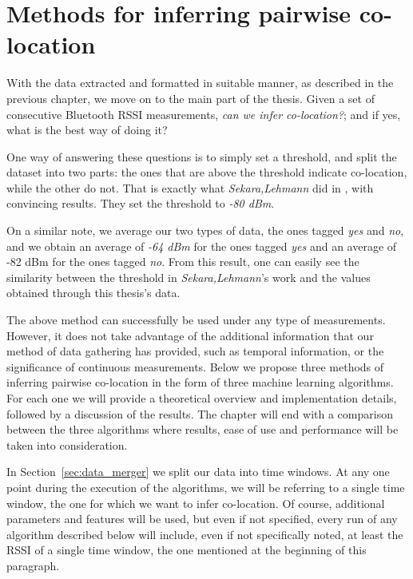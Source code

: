\chapter{Methods for inferring pairwise co-location}

With the data extracted and formatted in suitable manner, as described in the previous chapter, we move on to the main part of the thesis. Given a set of consecutive Bluetooth RSSI measurements, \textit{can we infer co-location?}; and if yes, what is the best way of doing it? 

One way of answering these questions is to simply set a threshold, and split the dataset into two parts: the ones that are above the threshold indicate co-location, while the other do not. That is exactly what \textit{Sekara,Lehmann} did in \cite{vedran}, with convincing results. They set the threshold to \textit{ -80 dBm}. 

On a similar note, we average our two types of data, the ones tagged \textit{yes} and \textit{no}, and we obtain an average of \textit{-64 dBm} for the ones tagged \textit{yes} and an average of {-82 dBm} for the ones tagged \textit{no}. From this result, one can easily see the similarity between the threshold in \textit{Sekara,Lehmann}'s work and the values obtained through this thesis's data. 

The above method can successfully be used under any type of measurements. However, it does not take advantage of the additional information that our method of data gathering has provided, such as temporal information, or the significance of continuous measurements. Below we propose three methods of inferring pairwise co-location in the form of three machine learning algorithms. For each one we will provide a theoretical overview and implementation details, followed by a discussion of the results. The chapter will end with a comparison between the three algorithms where results, ease of use and performance will be taken into consideration.

In Section~\ref{sec:data_merger} we split our data into time windows. At any one point during the execution of the algorithms, we will be referring to a single time window, the one for which we want to infer co-location. Of course, additional parameters and features will be used, but even if not specified, every run of any algorithm described below will include, even if not specifically noted, at least the RSSI of a single time window, the one mentioned at the beginning of this paragraph. 
 
